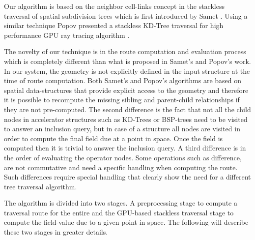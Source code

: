 Our algorithm is based on the neighbor cell-links concept in the stackless traversal of spatial subdivision trees 
which is first introduced by Samet \etal \cite{Samet1984,Samet1990}. Using a similar technique Popov \etal presented 
a stackless KD-Tree traversal for high performance GPU ray tracing algorithm \cite{Popov2007}. 

The novelty of our technique is in the route computation and evaluation process which is completely 
different than what is proposed in Samet's and Popov's work. In our system, the geometry is not explicitly 
defined in the input structure at the time of route computation. Both Samet's and Popov's algorithms are 
based on spatial data-structures that provide explicit access to the geometry and therefore it is possible 
to recompute the missing sibling and parent-child relationships if they are not pre-computed. The 
second difference is the fact that not all the child nodes in  accelerator structures such as KD-Trees or 
BSP-trees need to be visited to answer an inclusion query, but in case of a \blob structure all nodes are 
visited in order to compute the final field due at a point in space. Once the field is computed then it is 
trivial to answer the inclusion query. A third difference is in the order of evaluating the operator nodes. 
Some operations such as difference, are not commutative and need a specific handling when computing 
the route. Such differences require special handling that clearly show the need for a different tree 
traversal algorithm.


The algorithm is divided into two stages. A preprocessing stage to compute a traversal route for the entire 
\blob and the GPU-based stackless traversal stage to compute the field-value due to a given point in space. 
The following will describe these two stages in greater details.


